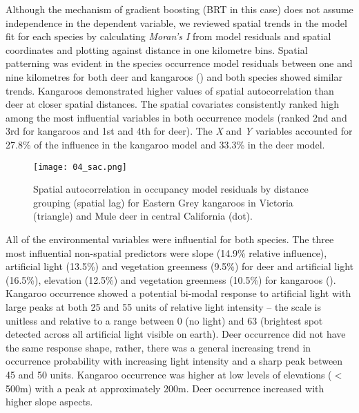 Although the mechanism of gradient boosting (BRT in this case) does not assume independence in the dependent variable, we reviewed spatial trends in the model fit for each species by calculating \textit{Moran's I} from model residuals and spatial coordinates and plotting against distance in one kilometre bins. Spatial patterning was evident in the species occurrence model residuals between one and nine kilometres for both deer and kangaroos () and both species showed similar trends.  Kangaroos demonstrated higher values of spatial autocorrelation than deer at closer spatial distances.  The spatial covariates consistently ranked high among the most influential variables in both occurrence models (ranked 2nd and 3rd for kangaroos and 1st and 4th for deer).  The \textit{X} and \textit{Y} variables accounted for 27.8\% of the influence in the kangaroo model and 33.3\% in the deer model.

\begin{figure*}[!h]
  \centering
  \texttt{[image: 04\_sac.png]}
  \caption[Spatial autocorrelation in occupancy model residuals for kangaroos and deer]{Spatial autocorrelation in occupancy model residuals by distance grouping (spatial lag) for Eastern Grey kangaroos in Victoria (triangle) and Mule deer in central California (dot).}
  \label{cal_sac_occ}
\end{figure*}

All of the environmental variables were influential for both species. The three most influential non-spatial predictors were slope (14.9\% relative influence), artificial light (13.5\%) and vegetation greenness (9.5\%) for deer and artificial light (16.5\%), elevation (12.5\%) and vegetation greenness (10.5\%) for kangaroos ().  Kangaroo occurrence showed a potential bi-modal response to artificial light with large peaks at both 25 and 55 units of relative light intensity -- the scale is unitless and relative to a range between 0 (no light) and 63 (brightest spot detected across all artificial light visible on earth).  Deer occurrence did not have the same response shape, rather, there was a general increasing trend in occurrence probability with increasing light intensity and a sharp peak between 45 and 50 units. Kangaroo occurrence was higher at low levels of elevations ($<$500m) with a peak at approximately 200m.  Deer occurrence increased with higher slope aspects.

